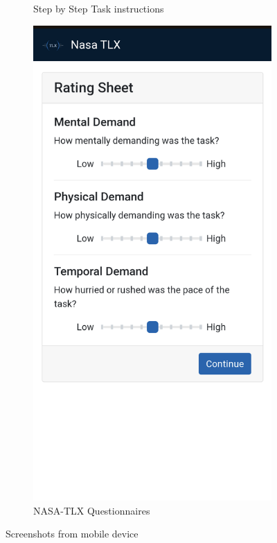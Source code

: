 \begin{figure}[h]
\begin{subfigure}[b]{0.45\columnwidth}
        \caption{Step by Step Task instructions}
        \label{fig:phone1}
    \end{subfigure}
    \begin{subfigure}[b]{0.45\columnwidth}
        \includegraphics[width=\textwidth]{images/nasa.png}
        \caption{NASA-TLX Questionnaires}
        \label{fig:phone2}
    \end{subfigure}
    \caption{Screenshots from mobile device}
    \label{fig:phone}
\end{figure}

